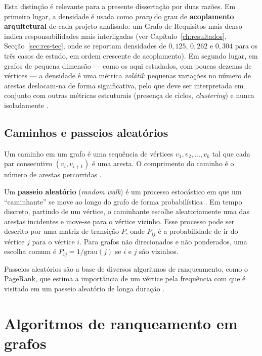 Esta distinção é relevante para a presente dissertação por duas
razões. Em primeiro lugar, a densidade é usada como \emph{proxy} do
grau de \textbf{acoplamento arquitetural} de cada projeto analisado:
um Grafo de Requisitos mais denso indica responsabilidades mais
interligadas (ver Capítulo~\ref{ch:resultados},
Secção~\ref{sec:res-tec}, onde se reportam densidades de $0{,}125$,
$0{,}262$ e $0{,}304$ para os três casos de estudo, em ordem crescente
de acoplamento). Em segundo lugar, em grafos de pequena dimensão ---
como os aqui estudados, com poucas dezenas de vértices --- a densidade
é uma métrica \emph{volátil}: pequenas variações no número de arestas
deslocam-na de forma significativa, pelo que deve ser interpretada em
conjunto com outras métricas estruturais (presença de ciclos,
\emph{clustering}) e nunca isoladamente \parencite{newman2010}.

\subsection{Caminhos e passeios aleatórios}
\label{sec:caminhos}

Um caminho em um grafo é uma sequência de vértices
$v_1, v_2, \ldots, v_k$ tal que cada par consecutivo
$(v_i, v_{i+1})$ é uma aresta. O comprimento do caminho é o número de
arestas percorridas \parencite{newman2010}.

Um \textbf{passeio aleatório} (\emph{random walk}) é um processo
estocástico em que um ``caminhante'' se move ao longo do grafo de
forma probabilística \parencite{masuda2017, ross2014}. Em tempo
discreto, partindo de um vértice, o caminhante escolhe aleatoriamente
uma das arestas incidentes e move-se para o vértice vizinho. Esse
processo pode ser descrito por uma matriz de transição $P$, onde
$P_{ij}$ é a probabilidade de ir do vértice $j$ para o vértice $i$.
Para grafos não direcionados e não ponderados, uma escolha comum é
$P_{ij} = 1/\text{grau}(j)$ se $i$ e $j$ são vizinhos.

Passeios aleatórios são a base de diversos algoritmos de ranqueamento,
como o PageRank, que estima a importância de um vértice pela frequência
com que é visitado em um passeio aleatório de longa duração
\parencite{page1999, masuda2017}.

\section{Algoritmos de ranqueamento em grafos}
\label{sec:algoritmos}

